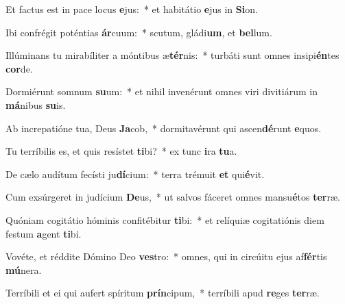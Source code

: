\item Et factus est in pace locus \textbf{e}jus:~* et habitátio \textbf{e}jus in \textbf{Si}on.
\item Ibi confrégit poténtias \textbf{ár}cuum:~* scutum, gládi\textbf{um}, et \textbf{bel}lum.
\item Illúminans tu mirabíliter a móntibus æ\textbf{tér}nis:~* turbáti sunt omnes insipi\textbf{én}tes \textbf{cor}de.
\item Dormiérunt somnum \textbf{su}um:~* et nihil invenérunt omnes viri divitiárum in \textbf{má}nibus \textbf{su}is.
\item Ab increpatióne tua, Deus \textbf{Ja}cob,~* dormitavérunt qui ascen\textbf{dé}runt \textbf{e}quos.
\item Tu terríbilis es, et quis resístet \textbf{ti}bi?~* ex tunc \textbf{i}ra \textbf{tu}a.
\item De cælo audítum fecísti ju\textbf{dí}cium:~* terra trémuit \textbf{et} qui\textbf{é}vit.
\item Cum exsúrgeret in judícium \textbf{De}us,~* ut salvos fáceret omnes mansu\textbf{é}tos \textbf{ter}ræ.
\item Quóniam cogitátio hóminis confitébitur \textbf{ti}bi:~* et relíquiæ cogitatiónis diem festum \textbf{a}gent \textbf{ti}bi.
\item Vovéte, et réddite Dómino Deo \textbf{ves}tro:~* omnes, qui in circúitu ejus af\textbf{fér}tis \textbf{mú}nera.
\item Terríbili et ei qui aufert spíritum \textbf{prín}cipum,~* terríbili apud \textbf{re}ges \textbf{ter}ræ.
